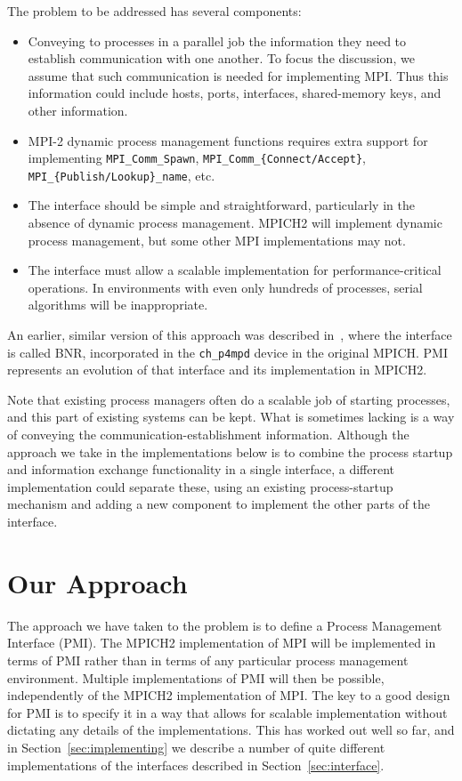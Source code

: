 \documentclass[11pt]{article}
\begin{document}
The problem to be addressed has several components:
\begin{itemize}
\item Conveying to processes in a parallel job the information they need
  to establish communication with one another.  To focus the discussion,
  we assume that such communication is needed for implementing MPI.
  Thus this information could include hosts, ports, interfaces,
  shared-memory keys, and other information.
\item MPI-2 dynamic process management functions requires extra support
  for implementing {\tt MPI\_Comm\_Spawn}, {\tt MPI\_Comm\_\{Connect/Accept\}},
  {\tt MPI\_\{Publish/Lookup\}\_name}, etc.
\item The interface should be simple and straightforward, particularly
  in the absence of dynamic process management.  MPICH2 will implement
  dynamic process management, but some other MPI implementations may
  not.
\item The interface must allow a scalable implementation for
  performance-critical operations.  In environments with even only hundreds
  of processes, serial algorithms will be inappropriate.
\end{itemize}
An earlier, similar version of this approach was described
in~\cite{butler-lusk-gropp:mpd-parcomp}, where the interface is called
BNR, incorporated in the {\tt ch\_p4mpd} device in the original MPICH.  PMI
represents an evolution of that interface and its implementation in MPICH2.

Note that existing process managers often do a scalable job of starting
processes, and this part of existing systems can be kept.  What is
sometimes lacking is a way of conveying the communication-establishment
information.  Although the approach we take in the implementations below
is to combine the process startup and information exchange functionality
in a single interface, a different implementation could separate these,
using an existing process-startup mechanism and adding a new component
to implement the other parts of the interface.

\section{Our Approach}
\label{sec:approach}

The approach we have taken to the problem is to define a Process
Management Interface (PMI).  The MPICH2 implementation of MPI will be
implemented in terms of PMI rather than in terms of any particular
process management environment.  Multiple implementations of PMI will
then be possible, independently of the MPICH2 implementation of MPI.
The key to a good design for PMI is to specify it in a way that allows for
scalable implementation without dictating any details of the
implementations.  This has worked out well so far, and in
Section~\ref{sec:implementing} we describe a number of quite different
implementations of the interfaces described in Section~\ref{sec:interface}.
\end{document}
